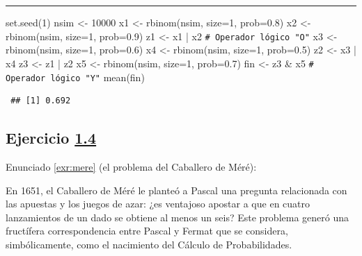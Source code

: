 \documentclass[
]{book}
\newenvironment{Shaded}{\begin{snugshade}}{\end{snugshade}}
\newcommand{\AttributeTok}[1]{\textcolor[rgb]{0.77,0.63,0.00}{#1}}
\newcommand{\CommentTok}[1]{\textcolor[rgb]{0.56,0.35,0.01}{\textit{#1}}}
\newcommand{\DecValTok}[1]{\textcolor[rgb]{0.00,0.00,0.81}{#1}}
\newcommand{\FloatTok}[1]{\textcolor[rgb]{0.00,0.00,0.81}{#1}}
\newcommand{\FunctionTok}[1]{\textcolor[rgb]{0.00,0.00,0.00}{#1}}
\newcommand{\NormalTok}[1]{#1}
\newcommand{\OtherTok}[1]{\textcolor[rgb]{0.56,0.35,0.01}{#1}}
\newcommand{\SpecialCharTok}[1]{\textcolor[rgb]{0.00,0.00,0.00}{#1}}
\theoremstyle{break}
\theoremstyle{nonumberplain}
\renewcommand{\CommentTok}[1]{\textcolor[rgb]{0.41,0.41,0.41}{\texttt{#1}}}
\begin{document}
\begin{center}\rule{0.5\linewidth}{0.5pt}\end{center}

\begin{Shaded}
\begin{Highlighting}[]
\FunctionTok{set.seed}\NormalTok{(}\DecValTok{1}\NormalTok{)}
\NormalTok{nsim }\OtherTok{\textless{}{-}} \DecValTok{10000}
\NormalTok{x1 }\OtherTok{\textless{}{-}} \FunctionTok{rbinom}\NormalTok{(nsim, }\AttributeTok{size=}\DecValTok{1}\NormalTok{, }\AttributeTok{prob=}\FloatTok{0.8}\NormalTok{)}
\NormalTok{x2 }\OtherTok{\textless{}{-}} \FunctionTok{rbinom}\NormalTok{(nsim, }\AttributeTok{size=}\DecValTok{1}\NormalTok{, }\AttributeTok{prob=}\FloatTok{0.9}\NormalTok{)}
\NormalTok{z1 }\OtherTok{\textless{}{-}}\NormalTok{ x1 }\SpecialCharTok{|}\NormalTok{ x2   }\CommentTok{\# Operador lógico "O"}
\NormalTok{x3 }\OtherTok{\textless{}{-}} \FunctionTok{rbinom}\NormalTok{(nsim, }\AttributeTok{size=}\DecValTok{1}\NormalTok{, }\AttributeTok{prob=}\FloatTok{0.6}\NormalTok{)}
\NormalTok{x4 }\OtherTok{\textless{}{-}} \FunctionTok{rbinom}\NormalTok{(nsim, }\AttributeTok{size=}\DecValTok{1}\NormalTok{, }\AttributeTok{prob=}\FloatTok{0.5}\NormalTok{)}
\NormalTok{z2 }\OtherTok{\textless{}{-}}\NormalTok{ x3 }\SpecialCharTok{|}\NormalTok{ x4}
\NormalTok{z3 }\OtherTok{\textless{}{-}}\NormalTok{ z1 }\SpecialCharTok{|}\NormalTok{ z2}
\NormalTok{x5 }\OtherTok{\textless{}{-}} \FunctionTok{rbinom}\NormalTok{(nsim, }\AttributeTok{size=}\DecValTok{1}\NormalTok{, }\AttributeTok{prob=}\FloatTok{0.7}\NormalTok{)}
\NormalTok{fin }\OtherTok{\textless{}{-}}\NormalTok{ z3 }\SpecialCharTok{\&}\NormalTok{ x5  }\CommentTok{\# Operador lógico "Y"}
\FunctionTok{mean}\NormalTok{(fin)}
\end{Highlighting}
\end{Shaded}

\begin{verbatim}
 ## [1] 0.692
\end{verbatim}

\hypertarget{sol-mere}{%
\subsection{\texorpdfstring{Ejercicio \href{ejercicios.html\#exr:mere}{1.4}}{Ejercicio 1.4}}\label{sol-mere}}

Enunciado \ref{exr:mere} (el problema del Caballero de Méré):

En 1651, el Caballero de Méré le planteó a Pascal una pregunta
relacionada con las apuestas y los juegos de azar: ¿es ventajoso
apostar a que en cuatro lanzamientos de un dado se obtiene al menos
un seis? Este problema generó una fructífera correspondencia entre
Pascal y Fermat que se considera, simbólicamente, como el nacimiento
del Cálculo de Probabilidades.
\end{document}

